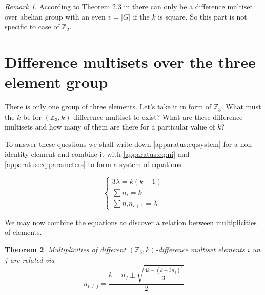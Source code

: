 \documentclass{article}
\theoremstyle{plain}
\newtheorem{theorem}{Theorem}[section]
\theoremstyle{definition}
\theoremstyle{remark}
\newtheorem{remark}[theorem]{Remark}
\begin{document}
			\begin{remark}
               According to Theorem 2.3 in \cite{arasu2005cyclic} there can only be a difference multiset over abelian group with an even $v=|G|$ if the $k$ is square. So this part is not specific to case of $\mathbb{Z}_2$.
			\end{remark}

	\section{Difference multisets over the three element group}
		There is only one group of three elements. Let's take it in form of $\mathbb Z_3$. What must the $k$ be for $(\mathbb Z_3,k)$-difference multiset to exist? What are these difference multisets and how many of them are there for a particular value of $k$?
		
		To answer these questions we shall write down \eqref{apparatus:eq:system} for a non-identity element and combine it with \eqref{apparatus:eq:ni} and \eqref{apparatus:eq:parameters} to form a system of equations.
		
		\begin{equation}
			\label{v3:eq:constraints}
			\begin{cases}
				3\lambda = k(k-1) \\
				\sum n_i = k \\
				\sum n_i n_{i+1} = \lambda
			\end{cases}
		\end{equation}
		
		We may now combine the equations to discover a relation between multiplicities of elements.
		
		\begin{theorem}
			\label{v3:theorem:relations}
			Multiplicities of different $(\mathbb Z_3,k)$-difference multiset elements $i$ un $j$ are related via
			\begin{equation}
				\label{v3:eq:relations}
				n_{i\neq j} = \frac{k-n_j \pm \sqrt{\frac{4k-(k-3n_j)^2}{3}}}{2}
			\end{equation}
		\end{theorem}
		
\end{document}
